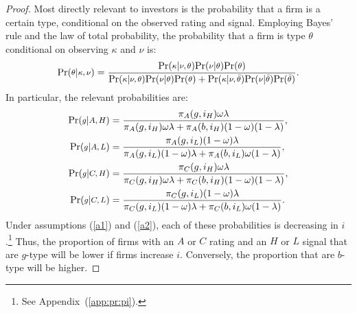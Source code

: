 \documentclass[notitlepage]{article}
\begin{document}
\begin{proof}
Most directly relevant to investors is the probability that a firm is a certain type, conditional on the observed rating and signal. Employing Bayes' rule and the law of total probability, the probability that a firm is type $\theta$ conditional on observing $\kappa$ and $\nu$ is:
\begin{equation*}
\textup{Pr}(\medmath{\theta}|\medmath{\kappa,\nu})=\frac{\textup{Pr}(\medmath{\kappa}|\medmath{\nu,\theta})\textup{Pr}(\medmath{\nu}|\medmath{\theta})\textup{Pr}(\medmath{\theta})}{\textup{Pr}(\medmath{\kappa}|\medmath{\nu,\theta})\textup{Pr}(\medmath{\nu}|\medmath{\theta})\textup{Pr}(\medmath{\theta})+\textup{Pr}(\medmath{\kappa}|\medmath{\nu,\bar{\theta}})\textup{Pr}(\medmath{\nu}|\medmath{\bar{\theta}})\textup{Pr}(\medmath{\bar{\theta}})}.
\end{equation*}
In particular, the relevant probabilities are:
\begin{align*}
\textup{Pr}(\medmath{g}|\medmath{A,H})&=%
\frac{\pi_{A}(g,i_{H})\omega\lambda}{\pi_{A}(g,i_{H})\omega\lambda+\pi_{A}(b,i_{H})(1-\omega)(1-\lambda)},\\
\textup{Pr}(\medmath{g}|\medmath{A,L})&=%
\frac{\pi_{A}(g,i_{L})(1-\omega)\lambda}{\pi_{A}(g,i_{L})(1-\omega)\lambda+\pi_{A}(b,i_{L})\omega(1-\lambda)},\\
\textup{Pr}(\medmath{g}|\medmath{C,H})&=%
\frac{\pi_{C}(g,i_{H})\omega\lambda}{\pi_{C}(g,i_{H})\omega\lambda+\pi_{C}(b,i_{H})(1-\omega)(1-\lambda)},\\
\textup{Pr}(\medmath{g}|\medmath{C,L})&=%
\frac{\pi_{C}(g,i_{L})(1-\omega)\lambda}{\pi_{C}(g,i_{L})(1-\omega)\lambda+\pi_{C}(b,i_{L})\omega(1-\lambda)}.
\end{align*}
Under assumptions (\ref{a1}) and (\ref{a2}), each of these probabilities is decreasing in $i$.\footnote{See Appendix~(\ref{app:pr:pi}).} Thus, the proportion of firms with an $A$ or $C$ rating and an $H$ or $L$ signal that are $g$-type will be lower if firms increase $i$. Conversely, the proportion that are $b$-type will be higher.


\end{proof}
\end{document}
